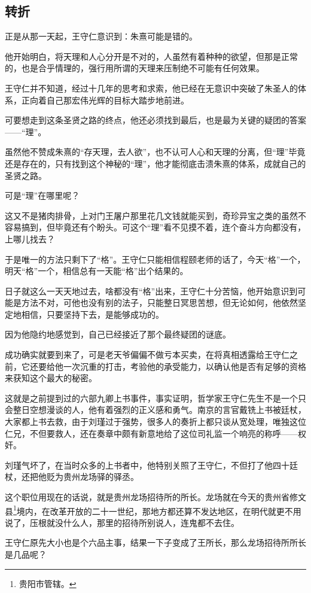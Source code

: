 \begin{multicols}{\theparacolNo}
\subsection{转折}
正是从那一天起，王守仁意识到：朱熹可能是错的。

他开始明白，将天理和人心分开是不对的，人虽然有着种种的欲望，但那是正常的，也是合乎情理的，强行用所谓的天理来压制绝不可能有任何效果。

王守仁并不知道，经过十几年的思考和求索，他已经在无意识中突破了朱圣人的体系，正向着自己那宏伟光辉的目标大踏步地前进。

可要想走到这条圣贤之路的终点，他还必须找到最后，也是最为关键的疑团的答案——“理”。

虽然他不赞成朱熹的“存天理，去人欲”，也不认可人心和天理的分离，但“理”毕竟还是存在的，只有找到这个神秘的“理”，他才能彻底击溃朱熹的体系，成就自己的圣贤之路。

可是“理”在哪里呢？

这又不是猪肉排骨，上对门王屠户那里花几文钱就能买到，奇珍异宝之类的虽然不容易搞到，但毕竟还有个盼头。可这个“理”看不见摸不着，连个奋斗方向都没有，上哪儿找去？

于是唯一的方法只剩下了“格”。王守仁只能相信程颐老师的话了，今天“格”一个，明天“格”一个，相信总有一天能“格”出个结果的。

日子就这么一天天地过去，啥都没有“格”出来，王守仁十分苦恼，他开始意识到可能是方法不对，可他也没有别的法子，只能整日冥思苦想，但无论如何，他依然坚定地相信，只要坚持下去，是能够成功的。

因为他隐约地感觉到，自己已经接近了那个最终疑团的谜底。

成功确实就要到来了，可是老天爷偏偏不做亏本买卖，在将真相透露给王守仁之前，它还要给他一次沉重的打击，考验他的承受能力，以确认他是否有足够的资格来获知这个最大的秘密。

这就是之前提到过的六部九卿上书事件，事实证明，哲学家王守仁先生不是一个只会整日空想漫谈的人，他有着强烈的正义感和勇气。南京的言官戴铣上书被廷杖，大家都上书去救，由于刘瑾过于强势，很多人的奏折上都只谈从宽处理，唯独这位仁兄，不但要救人，还在奏章中颇有新意地给了这位司礼监一个响亮的称呼——权奸。

刘瑾气坏了，在当时众多的上书者中，他特别关照了王守仁，不但打了他四十廷杖，还把他贬为贵州龙场驿的驿丞。

这个职位用现在的话说，就是贵州龙场招待所的所长。龙场就在今天的贵州省修文县\footnote{贵阳市管辖。}境内，在改革开放的二十一世纪，那地方都还算不发达地区，在明代就更不用说了，压根就没什么人，那里的招待所别说人，连鬼都不去住。

王守仁原先大小也是个六品主事，结果一下子变成了王所长，那么龙场招待所所长是几品呢？


\end{multicols}
